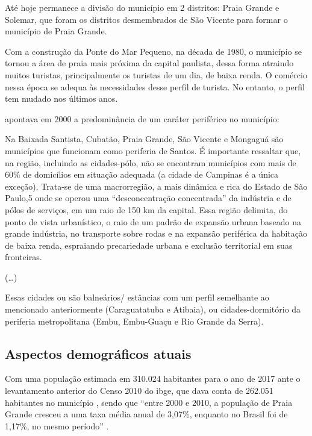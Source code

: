 	Até hoje permanece a divisão do município em 2 distritos: Praia Grande e Solemar, que foram os distritos desmembrados de São Vicente para formar o município de Praia Grande.
	
	Com a construção da Ponte do Mar Pequeno, na década de 1980, o município se tornou a área de praia mais próxima da capital paulista, dessa forma atraindo muitos turistas, principalmente os turistas de um dia, de baixa renda. O comércio nessa época se adequa às necessidades desse perfil de turista. No entanto, o perfil tem mudado nos últimos anos.
	
	 apontava em 2000 a predominância de um caráter periférico no município:
	
	\begin{citacao}
		Na Baixada Santista, Cubatão, Praia Grande, São Vicente e Mongaguá são municípios que funcionam como periferia de Santos. É importante ressaltar que, na região, incluindo as cidades-pólo, não se encontram municípios com mais de 60\% de domicílios em situação adequada (a cidade de Campinas é a única exceção). Trata-se de uma macrorregião, a mais dinâmica e rica do Estado de São Paulo,5 onde se operou uma “desconcentração concentrada” da indústria e de pólos de serviços, em um raio de 150 km da capital. Essa região delimita, do ponto de vista urbanístico, o raio de um padrão de expansão urbana baseado na grande indústria, no transporte sobre rodas e na expansão periférica da habitação de baixa renda, espraiando precariedade urbana e exclusão territorial em suas fronteiras.
		
		(\dots)
		
		Essas cidades ou são balneários/ estâncias com um perfil semelhante ao mencionado anteriormente (Caraguatatuba e Atibaia), ou cidades-dormitório da periferia metropolitana (Embu, Embu-Guaçu e Rio Grande da Serra).
		\cite[p.78]{Rolnik2000a}
	\end{citacao}
	
	\subsection{Aspectos demográficos atuais}
	
	Com uma população estimada em 310.024 habitantes para o ano de 2017 \cite{ibge2017a} ante o levantamento anterior do Censo 2010 do \gls{ibge}, que dava conta de 262.051 habitantes no município \cite{ibge2017a}, sendo que ``entre 2000 e 2010, a população de Praia Grande cresceu a uma taxa média anual de 3,07\%, enquanto no Brasil foi de 1,17\%, no mesmo período'' \cite{atlas2017a}.

